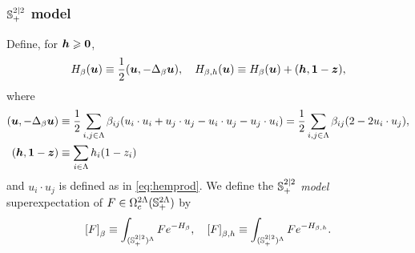 \documentclass[11pt,a4paper]{article}
\begin{document}
\subsubsection{${\mathbb S}^{2|2}_+$ model}
\label{sec:model-S22}

Define, for $\boldsymbol{h}\geqslant \boldsymbol{0}$,
\begin{equation}
  \label{eq:S22-def}
  H_{\beta}(\boldsymbol{u}) \equiv \frac{1}{2}(\boldsymbol{u},-\Delta_{\beta}\boldsymbol{u}),
  \quad H_{\beta,h}(\boldsymbol{u}) \equiv H_{\beta}(\boldsymbol{u}) + (\boldsymbol{h},\boldsymbol{1}-\boldsymbol{z}) ,
\end{equation}
where
\begin{equation}
  \label{eq:S22-Lap}
  \begin{split}
    (\boldsymbol{u},-\Delta_{\beta}\boldsymbol{u}) 
    &\equiv \frac{1}{2}\sum_{i,j\in\Lambda} \beta_{ij}( u_{i}\cdot u_{i} +
    u_{j}\cdot u_{j} - u_{i}\cdot u_{j} - u_j \cdot u_i)
    =
    \frac{1}{2}\sum_{i,j\in\Lambda} \beta_{ij}(2 - 2 u_{i}\cdot u_{j})
    , \\
     (\boldsymbol{h},\boldsymbol{1}-\boldsymbol{z})  & \equiv\sum_{i\in\Lambda}h_{i}(1-z_{i}) \\
    \end{split}
\end{equation}
and $u_{i}\cdot u_{j}$ is defined as in \eqref{eq:hemprod}.  We
define the \emph{${\mathbb S}^{2|2}_{+}$ model} superexpectation of
$F\in \Omega^{2\Lambda}_c({\mathbb S}^{2\Lambda}_+)$ by
\begin{equation}
    \label{eq:SGFF-Hem}
	\uspin{F}_\beta
  \bydef \int_{(\bbS^{2|2}_{+})^{\Lambda}}F e^{-H_{\beta}}, \quad
  \uspin{F}_{\beta,h}\bydef
  \int_{(\bbS^{2|2}_{+})^{\Lambda}}F e^{-H_{\beta,h}}.
\end{equation}
\end{document}
